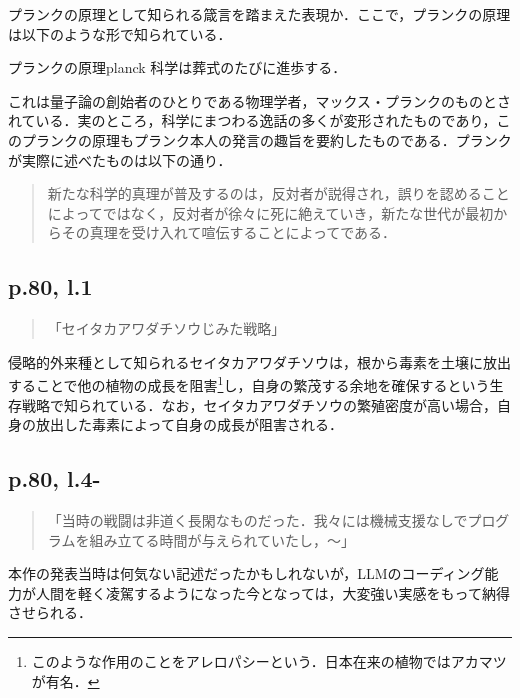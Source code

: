 \documentclass[10pt, a5paper, twoside]{ltjsarticle}
\begin{document}
            プランクの原理として知られる箴言を踏まえた表現か．ここで，プランクの原理は以下のような形で知られている．

            \begin{prn}{プランクの原理}{planck}
                科学は葬式のたびに進歩する．
            \end{prn}

            これは量子論の創始者のひとりである物理学者，マックス・プランクのものとされている．実のところ，科学にまつわる逸話の多くが変形されたものであり，このプランクの原理もプランク本人の発言の趣旨を要約したものである．プランクが実際に述べたものは以下の通り\cite{planck}．

            \begin{quote}
                新たな科学的真理が普及するのは，反対者が説得され，誤りを認めることによってではなく，反対者が徐々に死に絶えていき，新たな世代が最初からその真理を受け入れて喧伝することによってである．
            \end{quote}

        \subsection{p.80, l.1}

            \begin{quote}
                「セイタカアワダチソウじみた戦略」
            \end{quote}

            侵略的外来種として知られるセイタカアワダチソウは，根から毒素を土壌に放出することで他の植物の成長を阻害\footnote{このような作用のことをアレロパシーという．日本在来の植物ではアカマツが有名．}し，自身の繁茂する余地を確保するという生存戦略で知られている．なお，セイタカアワダチソウの繁殖密度が高い場合，自身の放出した毒素によって自身の成長が阻害される．

        \subsection{p.80, l.4-}

            \begin{quote}
                「当時の戦闘は非道く長閑なものだった．我々には機械支援なしでプログラムを組み立てる時間が与えられていたし，〜」
            \end{quote}

                本作の発表当時は何気ない記述だったかもしれないが，LLMのコーディング能力が人間を軽く凌駕するようになった今となっては，大変強い実感をもって納得させられる．
\end{document}
